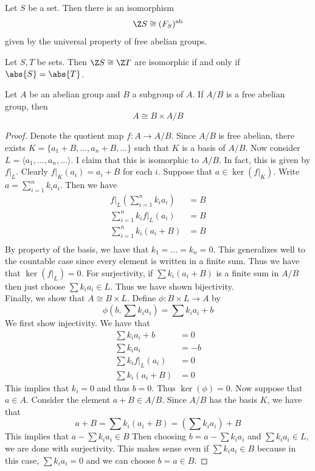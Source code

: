\documentclass[a4paper]{article}
\begin{document}
\begin{prp}{}{} Let $S$ be a set. Then there is an isomorphism $$\Z S\cong(F_S)^\text{ab}$$ given by the universal property of free abelian groups. 
\end{prp}

\begin{prp}{}{} Let $S,T$ be sets. Then $\Z S\cong\Z T$ are isomorphic if and only if $\abs{S}=\abs{T}$. 
\end{prp}

\begin{prp}{}{} Let $A$ be an abelian group and $B$ a subgroup of $A$. If $A/B$ is a free abelian group, then $$A\cong B\times A/B$$ 
\begin{proof}
Denote the quotient map $f:A\to A/B$. Since $A/B$ is free abelian, there exists $K=\{a_1+B,\dots,a_n+B,\dots\}$ such that $K$ is a basis of $A/B$. Now consider $L=\langle a_1,\dots,a_n,\dots\rangle$. I claim that this is isomorphic to $A/B$. In fact, this is given by $f|_L$. Clearly $f|_K(a_i)=a_i+B$ for each $i$. Suppose that $a\in\ker(f|_K)$. Write $a=\sum_{i=1}^nk_ia_i$. Then we have 
\begin{align*}
f|_L\left(\sum_{i=1}^nk_ia_i\right)&=B\\
\sum_{i=1}^nk_if|_L(a_i)&=B\\
\sum_{i=1}^nk_i(a_i+B)&=B\\
\end{align*}
By property of the basis, we have that $k_1=\dots=k_n=0$. This generalizes well to the countable case since every element is written in a finite sum. Thus we have that $\ker(f|_L)=0$. For surjectivity, if $\sum k_i(a_i+B)$ is a finite sum in $A/B$ then just choose $\sum k_ia_i\in L$. Thus we have shown bijectivity. \\
Finally, we show that $A\cong B\times L$. Define $\phi:B\times L\to A$ by $$\phi\left(b,\sum k_ia_i\right)=\sum k_ia_i+b$$ We first show injectivity. We have that 
\begin{align*}
\sum k_ia_i+b&=0\\
\sum k_ia_i&=-b\\
\sum k_if|_L(a_i)&=0\\
\sum k_i(a_i+B)&=0
\end{align*}
This implies that $k_i=0$ and thus $b=0$. Thus $\ker(\phi)=0$. Now suppose that $a\in A$. Consider the element $a+B\in A/B$. Since $A/B$ has the basis $K$, we have that $$a+B=\sum k_i(a_i+B)=\left(\sum k_ia_i\right)+B$$ This implies that $a-\sum k_ia_i\in B$ Then choosing $b=a-\sum k_ia_i$ and $\sum k_ia_i\in L$, we are done with surjectivity. This makes sense even if $\sum k_ia_i\in B$ because in this case, $\sum k_ia_i=0$ and we can choose $b=a\in B$. 
\end{proof}
\end{prp}
\end{document}
